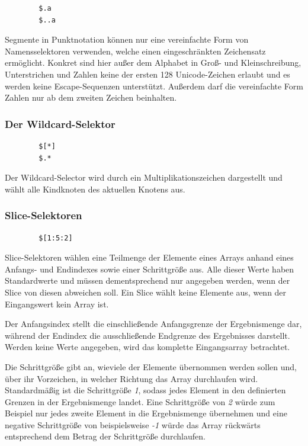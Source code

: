 \documentclass[oneside]{ausarbeitung}
\begin{document}
	\begin{lstlisting}
		$.a
		$..a
	\end{lstlisting}
	
	Segmente in Punktnotation können nur eine vereinfachte Form von Namensselektoren verwenden, welche einen eingeschränkten Zeichensatz ermöglicht. Konkret sind hier außer dem Alphabet in Groß- und Kleinschreibung, Unterstrichen und Zahlen keine der ersten 128 Unicode-Zeichen erlaubt und es werden keine Escape-Sequenzen unterstützt. Außerdem darf die vereinfachte Form Zahlen nur ab dem zweiten Zeichen beinhalten.
	
	
	
	\subsubsection{Der Wildcard-Selektor}
	
	\begin{lstlisting}
		$[*]
		$.*
	\end{lstlisting}
	
	Der Wildcard-Selector wird durch ein Multiplikationszeichen dargestellt und wählt alle Kindknoten des aktuellen Knotens aus.
	
	
	
	\subsubsection{Slice-Selektoren}
	
	\begin{lstlisting}
		$[1:5:2]
	\end{lstlisting}
	
	Slice-Selektoren wählen eine Teilmenge der Elemente eines Arrays anhand eines Anfangs- und Endindexes sowie einer Schrittgröße aus. Alle dieser Werte haben Standardwerte und müssen dementsprechend nur angegeben werden, wenn der Slice von diesen abweichen soll. Ein Slice wählt keine Elemente aus, wenn der Eingangswert kein Array ist.
	
	 Der Anfangsindex stellt die einschließende Anfangsgrenze der Ergebnismenge dar, während der Endindex die ausschließende Endgrenze des Ergebnisses darstellt. Werden keine Werte angegeben, wird das komplette Eingangsarray betrachtet.
	 
	 Die Schrittgröße gibt an, wieviele der Elemente übernommen werden sollen und, über ihr Vorzeichen, in welcher Richtung das Array durchlaufen wird. Standardmäßig ist die Schrittgröße \textit{1}, sodass jedes Element in den definierten Grenzen in der Ergebnismenge landet. Eine Schrittgröße von \textit{2} würde zum Beispiel nur jedes zweite Element in die Ergebnismenge übernehmen und eine negative Schrittgröße von beispielsweise \textit{-1} würde das Array rückwärts entsprechend dem Betrag der Schrittgröße durchlaufen. 
	 
\end{document}
